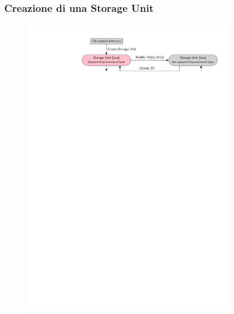 \documentclass{beamer}
\begin{document}
\begin{frame}[fragile]
	\frametitle{Creazione di una Storage Unit}
	\begin{figure}
		\includegraphics[width=0.8\textwidth]{figures/uuo.pdf}
	\end{figure}
	\begin{columns}
		\begin{figure}

\end{figure}
\end{columns}
\end{frame}
\end{document}
